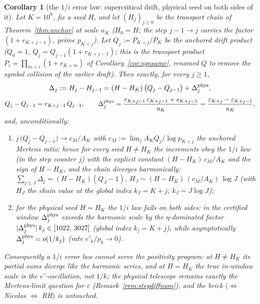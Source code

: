 \documentclass[11pt]{article}
\newtheorem{corollary}[theorem]{Corollary}
\theoremstyle{remark}
\newcommand{\eps}{\varepsilon}
\begin{document}
\begin{corollary}[the $1/i$ error law: supercritical drift, physical seed on
both sides of it]\label{cor:invlaw}
Let $K=10^8$, fix a seed $H$, and let $(H_j)_{j\ge0}$ be the transport
chain of Theorem~\ref{thm:anchor} at scale $u_K$ ($H_0=H$; the step
$j-1\to j$ carries the factor $(1+r_{K+j-1})$, prime $p_{K+j}$). Let
$Q_j:=P_{K+j}/P_K$ be the anchored drift product ($Q_0=1$,
$Q_j=Q_{j-1}(1+r_{K+j-1})$; this is the transport product
$P_i=\prod_{m<i}(1+r_{K+m})$ of Corollary~\ref{cor:sgnsame}, renamed
$Q$ to remove the symbol collision of the earlier draft). Then
exactly, for every $j\ge1$,
\[
\Delta_j:=H_j-H_{j-1}=(H-H_K)\,\bigl(Q_j-Q_{j-1}\bigr)+\Delta^{\rm phys}_j,
\]
\[
Q_j-Q_{j-1}=r_{K+j-1}\,Q_{j-1},
\qquad
\Delta^{\rm phys}_j=\frac{r_{K+j-1}\,\eps_{K+j-1}+s_{K+j-1}}{u_K}
=\frac{\eps_{K+j}-\eps_{K+j-1}}{u_K},
\]
and, unconditionally:
\begin{enumerate}
\item[(a)] $j\,\bigl(Q_j-Q_{j-1}\bigr)\to c_M/A_K$ with $c_M:=\lim_j
A_KQ_j/\log p_{K+j}$ the anchored Mertens ratio; hence for every seed
$H\ne H_K$ the increments obey the $1/i$ law (in the step counter $j$)
with the \emph{explicit constant} $(H-H_K)\,c_M/A_K$ and the sign of
$H-H_K$, and the chain diverges harmonically:
$\sum_{j\le J}\Delta_j=(H-H_K)(Q_J-1)$,
$H_J\sim(H-H_K)\,(c_M/A_K)\,\log J$ (with $H_J$ the chain value at the
global index $k_J=K+j$; $k_J\sim J\log J$);
\item[(b)] for the physical seed $H=H_K$ the $1/i$ law fails on
\emph{both sides}: in the certified window $\Delta^{\rm phys}_j$
exceeds the harmonic scale by the $\eta$-dominated factor
$|\Delta^{\rm phys}_j|\,k_j\in[1022,\,3027]$ (global index
$k_j=K+j$), while asymptotically $\Delta^{\rm phys}_j=o(1/k_j)$
(rate $e'_k/p_k\to0$).
\end{enumerate}
Consequently a $1/i$ error law cannot serve the positivity program: at
$H\ne H_K$ its partial sums diverge like the harmonic series, and at
$H=H_K$ the true in-window scale is the $e'$-oscillation, not $1/k$;
the physical telescope remains exactly the Mertens-limit question for
$\eps$ (Remark~\ref{rem:stepdiffnum}), and the brick
$\bigl(\iff$ Nicolas $\iff$ RH$\bigr)$ is untouched.
\end{corollary}
\end{document}
